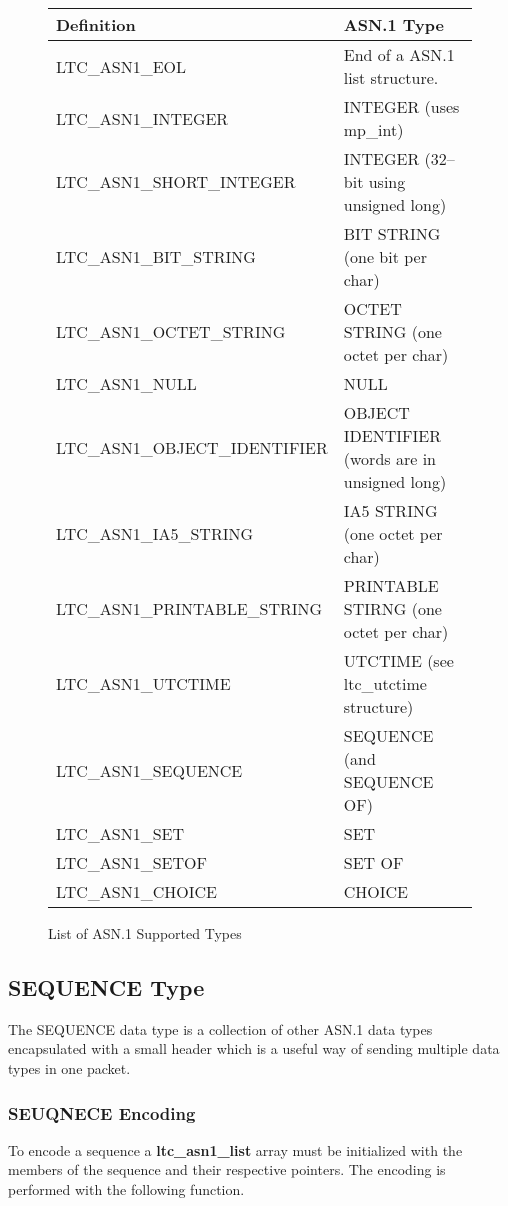 \documentclass[a4paper]{book}
\begin{document}
\begin{figure}[here]
\begin{center}
\begin{small}
\begin{tabular}{|l|l|}
\hline \textbf{Definition}           & \textbf{ASN.1 Type} \\
\hline LTC\_ASN1\_EOL                & End of a ASN.1 list structure. \\
\hline LTC\_ASN1\_INTEGER            & INTEGER (uses mp\_int) \\
\hline LTC\_ASN1\_SHORT\_INTEGER     & INTEGER (32--bit using unsigned long) \\
\hline LTC\_ASN1\_BIT\_STRING        & BIT STRING (one bit per char) \\
\hline LTC\_ASN1\_OCTET\_STRING      & OCTET STRING (one octet per char) \\
\hline LTC\_ASN1\_NULL               & NULL \\
\hline LTC\_ASN1\_OBJECT\_IDENTIFIER & OBJECT IDENTIFIER (words are in unsigned long) \\
\hline LTC\_ASN1\_IA5\_STRING        & IA5 STRING (one octet per char) \\
\hline LTC\_ASN1\_PRINTABLE\_STRING  & PRINTABLE STIRNG (one octet per char) \\
\hline LTC\_ASN1\_UTCTIME            & UTCTIME (see ltc\_utctime structure) \\
\hline LTC\_ASN1\_SEQUENCE           & SEQUENCE (and SEQUENCE OF) \\
\hline LTC\_ASN1\_SET                & SET \\
\hline LTC\_ASN1\_SETOF              & SET OF \\
\hline LTC\_ASN1\_CHOICE             & CHOICE \\
\hline
\end{tabular}
\caption{List of ASN.1 Supported Types}
\end{small}
\end{center}
\end{figure}

\subsection{SEQUENCE Type}
The SEQUENCE data type is a collection of other ASN.1 data types encapsulated with a small header which is a useful way of sending multiple data types in one packet.

\subsubsection{SEUQNECE Encoding}
To encode a sequence a \textbf{ltc\_asn1\_list} array must be initialized with the members of the sequence and their respective pointers.  The encoding is performed
with the following function.
\end{document}

